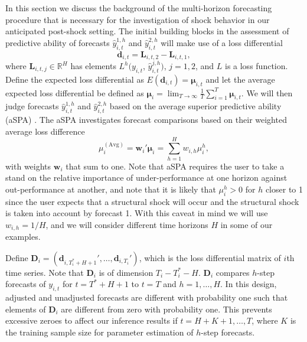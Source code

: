 \documentclass[11pt]{article}
\newcommand{\R}{\mathbb{R}}
\newcommand{\dbf}{\textbf{d}}
\newcommand{\Llet}{\textbf{L}}
\def\mbf#1{\mathbf{#1}} %
\theoremstyle{definition}
\begin{document}
In this section we discuss the background of the multi-horizon forecasting procedure \citep{quaedvlieg2021multi} that is necessary for the investigation of shock behavior in our anticipated post-shock setting. The initial building blocks in the assessment of predictive ability of forecasts $\hat y^{1,h}_{i,t}$ and $\hat y^{2,h}_{i,t}$ will make use of a loss differential
$$
  \dbf_{i,t} =  \Llet_{i,t,2} - \Llet_{i,t,1},
$$
where $\Llet_{i,t,j} \in \R^H$ has elements $L^h(y_{i,t}$, $\hat y_{i,t}^{j,h})$, $j = 1,2$, and $L$ is a loss function. Define the expected loss differential as  $E(\dbf_{i,t}) = \mbf\mu_{i,t}$ and let the average expected loss differential be defined as $\mathbf{\mu}_i = \lim_{T\to\infty}\frac{1}{T}\sum_{i=1}^T \mathbf{\mu}_{i,t}$.
We will then judge forecasts $\hat y^{1,h}_{i,t}$ and $\hat y^{2,h}_{i,t}$ based on the average superior predictive ability (aSPA) \citep{quaedvlieg2021multi}. The aSPA investigates forecast comparisons based on their weighted average loss difference
$$
  \mu^{(\text{Avg})}_i = \textbf{w}_i'\mathbf{\mu}_i = \sum_{h=1}^H w_{i,h} \mu_i^h,
$$
with weights $\textbf{w}_i$ that sum to one. Note that aSPA requires the user to take a stand on the relative importance of under-performance at one horizon against out-performance at another, and note that it is likely that $\mu_i^h > 0$ for $h$ closer to 1 since the user expects that a structural shock will occur and the structural shock is taken into account by forecast 1. With this caveat in mind we will use $w_{i,h} = 1/H$, and we will consider different time horizons $H$ in some of our examples.


Define $\mbf{D}_i = (\mbf{d}_{i, T^*_i+H+1}', \ldots, \mbf{d}_{i, T_i}')$, which is the loss differential matrix of $i$th time series. Note that $\mbf{D}_i$ is of dimension $T_i-T^*_i - H$.   $\mbf{D}_i$ compares $h$-step forecasts of $y_{i, t}$ for $t = T^* + H + 1$ to $t = T$ and $h= 1, \ldots, H$. In this design, adjusted and unadjusted forecasts are different with probability one such that elements of $\mbf{D}_i$ are different from zero with probability one. This prevents excessive zeroes to affect our inference results if $t = H+K +1,  \ldots, T$, where $K$ is the training sample size for parameter estimation of $h$-step forecasts.
\end{document}
